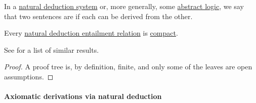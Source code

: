 \begin{definition}\label{def:interderivability}\mimprovised
  In a \hyperref[def:abstract_natural_deduction_system]{natural deduction system} or, more generally, some \hyperref[def:abstract_logic]{abstract logic}, we say that two sentences are  if each can be derived from the other.
\end{definition}

\begin{proposition}\label{thm:propositional_natural_deduction_entailment_compact}
  Every \hyperref[def:natural_deduction_entailment]{natural deduction entailment relation} is \hyperref[def:consequence_relation/compactness]{compact}.
\end{proposition}
\begin{comments}
  \item See  for a list of similar results.
\end{comments}
\begin{proof}
  A proof tree is, by definition, finite, and only some of the leaves are open assumptions.
\end{proof}

\paragraph{Axiomatic derivations via natural deduction}

